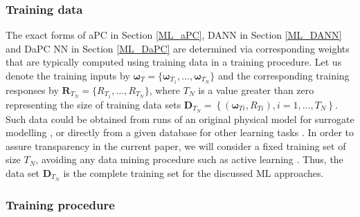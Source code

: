 \documentclass[a4paper,fleqn]{article}
\newcommand{\rw}[1]{\textcolor{blue}{#1}}
\renewcommand{\rw}[1]{#1}
\begin{document}
\subsubsection{Training data}
The exact forms of aPC in Section \ref{ML_aPC}, DANN in Section \ref{ML_DANN} and DaPC NN in Section \ref{ML_DaPC} are determined via corresponding weights that are typically computed using training data in a training procedure. Let us denote the training inputs by $\bm{\omega}_T=\{\bm{\omega}_{T_1},\ldots,\bm{\omega}_{T_N} \}$ and the corresponding training responses by $\mathbf{R}_{T_N}=\{R_{T_1},\ldots,R_{T_N}\}$, where $T_N$ is a value greater than zero representing the size of training data sets $\bm{D}_{T_N}=\left\{(\bm{\omega}_{Ti},R_{Ti}), i=1,\ldots,T_N \right\}$. Such data could be obtained from runs of an original physical model for surrogate modelling \cite{OladNowak_RESS2012,beckers2020bayesian}, or directly from a given database for other learning tasks \cite{deng2009imagenet,krizhevsky2017cnn,huang2018densely}. In order to assure transparency in the current paper, we will consider a fixed training set of size $T_N$, avoiding any data mining procedure such as active learning \rw{\cite{oladyshkin2020bayesian3,settles.tr09}}. Thus, the data set $\bm{D}_{T_N}$ is the complete training set for the discussed ML approaches. 

\subsubsection{Training procedure}
\end{document}
